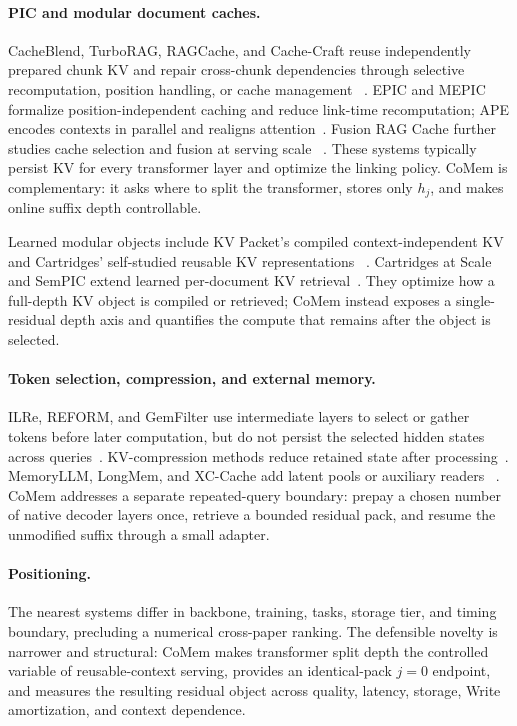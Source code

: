\paragraph{PIC and modular document caches.}
CacheBlend, TurboRAG, RAGCache, and Cache-Craft reuse independently prepared
chunk KV and repair cross-chunk dependencies through selective recomputation,
position handling, or cache management
~\citep{cacheblend,turborag,ragcache,cachecraft}. EPIC and MEPIC formalize
position-independent caching and reduce link-time recomputation; APE encodes
contexts in parallel and realigns attention~\citep{epic,mepic,ape}. Fusion RAG
Cache further studies cache selection and fusion at serving scale
~\citep{fusionrag}. These systems typically persist KV for every transformer
layer and optimize the linking policy. CoMem is complementary: it asks where to
split the transformer, stores only $h_j$, and makes online suffix depth
controllable.

Learned modular objects include KV Packet's compiled context-independent KV and
Cartridges' self-studied reusable KV representations
~\citep{kvpacket,cartridgesbase}. Cartridges at Scale and SemPIC extend learned
per-document KV retrieval~\citep{cartridges,sempic}. They optimize how a
full-depth KV object is compiled or retrieved; CoMem instead exposes a
single-residual depth axis and quantifies the compute that remains after the
object is selected.

\paragraph{Token selection, compression, and external memory.}
ILRe, REFORM, and GemFilter use intermediate layers to select or gather tokens
before later computation, but do not persist the selected hidden states across
queries~\citep{ilre,reform,gemfilter}. KV-compression methods reduce retained
state after processing~\citep{streamingllm,h2o,snapkv,pyramidkv,minicache}.
MemoryLLM, LongMem, and XC-Cache add latent pools or auxiliary readers
~\citep{memoryllm,longmem,xccache}. CoMem addresses a separate repeated-query
boundary: prepay a chosen number of native decoder layers once, retrieve a
bounded residual pack, and resume the unmodified suffix through a small
adapter.

\paragraph{Positioning.}
The nearest systems differ in backbone, training, tasks, storage tier, and
timing boundary, precluding a numerical cross-paper ranking. The defensible
novelty is narrower and structural: CoMem makes transformer split depth the
controlled variable of reusable-context serving, provides an identical-pack
$j{=}0$ endpoint, and measures the resulting residual object across quality,
latency, storage, Write amortization, and context dependence.
